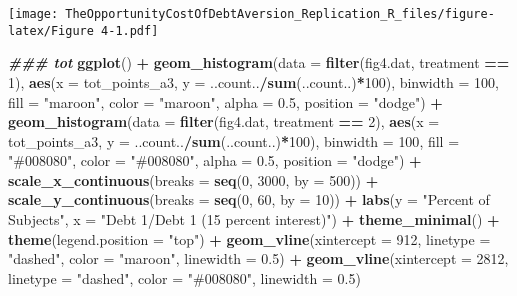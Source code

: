 \documentclass[
]{article}
\newenvironment{Shaded}{\begin{snugshade}}{\end{snugshade}}
\newcommand{\AttributeTok}[1]{\textcolor[rgb]{0.13,0.29,0.53}{#1}}
\newcommand{\DecValTok}[1]{\textcolor[rgb]{0.00,0.00,0.81}{#1}}
\newcommand{\DocumentationTok}[1]{\textcolor[rgb]{0.56,0.35,0.01}{\textbf{\textit{#1}}}}
\newcommand{\FloatTok}[1]{\textcolor[rgb]{0.00,0.00,0.81}{#1}}
\newcommand{\FunctionTok}[1]{\textcolor[rgb]{0.13,0.29,0.53}{\textbf{#1}}}
\newcommand{\NormalTok}[1]{#1}
\newcommand{\SpecialCharTok}[1]{\textcolor[rgb]{0.81,0.36,0.00}{\textbf{#1}}}
\newcommand{\StringTok}[1]{\textcolor[rgb]{0.31,0.60,0.02}{#1}}
\begin{document}
\texttt{[image: TheOpportunityCostOfDebtAversion\_Replication\_R\_files/figure-latex/Figure 4-1.pdf]}

\begin{Shaded}
\begin{Highlighting}[]
\DocumentationTok{\#\#\# tot}
\FunctionTok{ggplot}\NormalTok{() }\SpecialCharTok{+}
  \FunctionTok{geom\_histogram}\NormalTok{(}\AttributeTok{data =} \FunctionTok{filter}\NormalTok{(fig4.dat, treatment }\SpecialCharTok{==} \DecValTok{1}\NormalTok{),}
                 \FunctionTok{aes}\NormalTok{(}\AttributeTok{x =}\NormalTok{ tot\_points\_a3, }\AttributeTok{y =}\NormalTok{ ..count..}\SpecialCharTok{/}\FunctionTok{sum}\NormalTok{(..count..)}\SpecialCharTok{*}\DecValTok{100}\NormalTok{),}
                 \AttributeTok{binwidth =} \DecValTok{100}\NormalTok{, }\AttributeTok{fill =} \StringTok{"maroon"}\NormalTok{, }\AttributeTok{color =} \StringTok{"maroon"}\NormalTok{, }\AttributeTok{alpha =} \FloatTok{0.5}\NormalTok{, }\AttributeTok{position =} \StringTok{"dodge"}\NormalTok{) }\SpecialCharTok{+}
  \FunctionTok{geom\_histogram}\NormalTok{(}\AttributeTok{data =} \FunctionTok{filter}\NormalTok{(fig4.dat, treatment }\SpecialCharTok{==} \DecValTok{2}\NormalTok{),}
                 \FunctionTok{aes}\NormalTok{(}\AttributeTok{x =}\NormalTok{ tot\_points\_a3, }\AttributeTok{y =}\NormalTok{ ..count..}\SpecialCharTok{/}\FunctionTok{sum}\NormalTok{(..count..)}\SpecialCharTok{*}\DecValTok{100}\NormalTok{),}
                 \AttributeTok{binwidth =} \DecValTok{100}\NormalTok{, }\AttributeTok{fill =} \StringTok{"\#008080"}\NormalTok{, }\AttributeTok{color =} \StringTok{"\#008080"}\NormalTok{, }\AttributeTok{alpha =} \FloatTok{0.5}\NormalTok{, }\AttributeTok{position =} \StringTok{"dodge"}\NormalTok{) }\SpecialCharTok{+}
  \FunctionTok{scale\_x\_continuous}\NormalTok{(}\AttributeTok{breaks =} \FunctionTok{seq}\NormalTok{(}\DecValTok{0}\NormalTok{, }\DecValTok{3000}\NormalTok{, }\AttributeTok{by =} \DecValTok{500}\NormalTok{)) }\SpecialCharTok{+}
  \FunctionTok{scale\_y\_continuous}\NormalTok{(}\AttributeTok{breaks =} \FunctionTok{seq}\NormalTok{(}\DecValTok{0}\NormalTok{, }\DecValTok{60}\NormalTok{, }\AttributeTok{by =} \DecValTok{10}\NormalTok{)) }\SpecialCharTok{+}
  \FunctionTok{labs}\NormalTok{(}\AttributeTok{y =} \StringTok{"Percent of Subjects"}\NormalTok{, }\AttributeTok{x =} \StringTok{"Debt 1/Debt 1 (15 percent interest)"}\NormalTok{) }\SpecialCharTok{+}
  \FunctionTok{theme\_minimal}\NormalTok{() }\SpecialCharTok{+}
  \FunctionTok{theme}\NormalTok{(}\AttributeTok{legend.position =} \StringTok{"top"}\NormalTok{) }\SpecialCharTok{+}
  \FunctionTok{geom\_vline}\NormalTok{(}\AttributeTok{xintercept =} \DecValTok{912}\NormalTok{, }\AttributeTok{linetype =} \StringTok{"dashed"}\NormalTok{, }\AttributeTok{color =} \StringTok{"maroon"}\NormalTok{, }\AttributeTok{linewidth =} \FloatTok{0.5}\NormalTok{) }\SpecialCharTok{+}
  \FunctionTok{geom\_vline}\NormalTok{(}\AttributeTok{xintercept =} \DecValTok{2812}\NormalTok{, }\AttributeTok{linetype =} \StringTok{"dashed"}\NormalTok{, }\AttributeTok{color =} \StringTok{"\#008080"}\NormalTok{, }\AttributeTok{linewidth =} \FloatTok{0.5}\NormalTok{)}
\end{Highlighting}
\end{Shaded}
\end{document}
